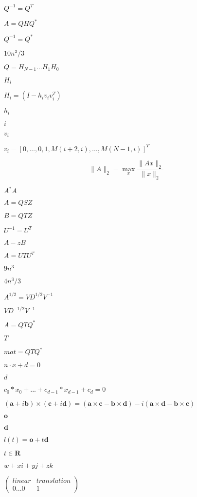 \documentclass{article}
\begin{document}
$ Q^{-1} = Q^T $
\pagebreak

$ A = Q H Q^* $
\pagebreak

$ Q^{-1} = Q^* $
\pagebreak

$ 10n^3/3 $
\pagebreak

$ Q = H_{N-1} \ldots H_1 H_0 $
\pagebreak

$ H_i $
\pagebreak

$ H_i = (I - h_i v_i v_i^T) $
\pagebreak

$ h_i $
\pagebreak

$ i $
\pagebreak

$ v_i $
\pagebreak

$ v_i = [ 0, \ldots, 0, 1, M(i+2,i), \ldots, M(N-1,i) ]^T $
\pagebreak

\[ \|A\|_2 = \max_x \frac{\|Ax\|_2}{\|x\|_2} \]
\pagebreak

$ A^*A $
\pagebreak

$ A = Q S Z $
\pagebreak

$ B = Q T Z $
\pagebreak

$ U^{-1} = U^T $
\pagebreak

$ A - z B $
\pagebreak

$ A = U T U^T $
\pagebreak

$ 9n^3 $
\pagebreak

$ 4n^3/3 $
\pagebreak

$ A^{1/2} = V D^{1/2} V^{-1} $
\pagebreak

$ V D^{-1/2} V^{-1} $
\pagebreak

$ A = Q T Q^* $
\pagebreak

$ T $
\pagebreak

$ mat = Q T Q^* $
\pagebreak

$ n \cdot x + d = 0 $
\pagebreak

$ d $
\pagebreak

$ c_0*x_0 + ... + c_{d-1}*x_{d-1} + c_d = 0 $
\pagebreak

$ (\mathbf{a}+i\mathbf{b}) \times (\mathbf{c}+i\mathbf{d}) = (\mathbf{a} \times \mathbf{c} - \mathbf{b} \times \mathbf{d}) - i(\mathbf{a} \times \mathbf{d} - \mathbf{b} \times \mathbf{c})$
\pagebreak

$ \mathbf{o} $
\pagebreak

$ \mathbf{d} $
\pagebreak

$ l(t) = \mathbf{o} + t \mathbf{d} $
\pagebreak

$ t \in \mathbf{R} $
\pagebreak

$ w+xi+yj+zk $
\pagebreak

$ \left( \begin{array}{cc}
 linear & translation\\
 0 ... 0 & 1
 \end{array} \right) $
\pagebreak
\end{document}
